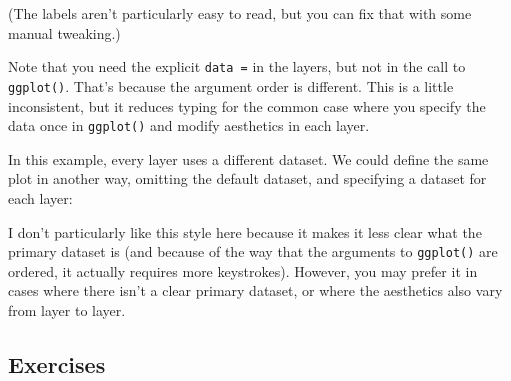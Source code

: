 (The labels aren't particularly easy to read, but you can fix that with
some manual tweaking.)

Note that you need the explicit \texttt{data\ =} in the layers, but not
in the call to \texttt{ggplot()}. That's because the argument order is
different. This is a little inconsistent, but it reduces typing for the
common case where you specify the data once in \texttt{ggplot()} and
modify aesthetics in each layer.

In this example, every layer uses a different dataset. We could define
the same plot in another way, omitting the default dataset, and
specifying a dataset for each layer:

\begin{Shaded}
\begin{Highlighting}[]
\NormalTok{(} \StringTok{ }
\StringTok{  }\NormalTok{(} \StringTok{ }
\StringTok{  }\NormalTok{(} \StringTok{ }
\StringTok{  }\NormalTok{(} \NormalTok{(} 
\end{Highlighting}
\end{Shaded}

I don't particularly like this style here because it makes it less clear
what the primary dataset is (and because of the way that the arguments
to \texttt{ggplot()} are ordered, it actually requires more keystrokes).
However, you may prefer it in cases where there isn't a clear primary
dataset, or where the aesthetics also vary from layer to layer.

\subsection{Exercises}


